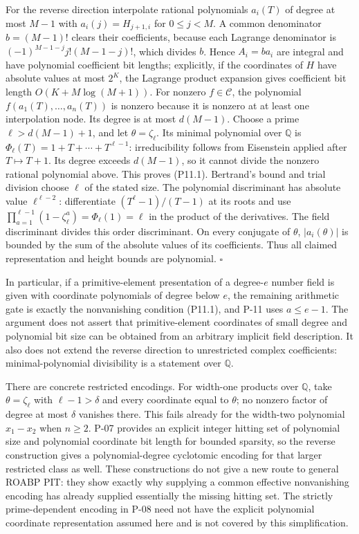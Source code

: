 \documentclass[11pt,a4paper]{article}
\theoremstyle{definition}\newtheorem{definition}{Definition}
\begin{document}
For the reverse direction interpolate rational polynomials $a_i(T)$ of degree at most $M-1$ with $a_i(j)=H_{j+1,i}$ for $0\le j<M$. A common denominator $b=(M-1)!$ clears their coefficients, because each Lagrange denominator is $(-1)^{M-1-j}j!(M-1-j)!$, which divides $b$. Hence $A_i=ba_i$ are integral and have polynomial coefficient bit lengths; explicitly, if the coordinates of $H$ have absolute values at most $2^K$, the Lagrange product expansion gives coefficient bit length $O(K+M\log(M+1))$. For nonzero $f\in\mathcal C$, the polynomial $f(a_1(T),\ldots,a_n(T))$ is nonzero because it is nonzero at at least one interpolation node. Its degree is at most $d(M-1)$. Choose a prime $\ell>d(M-1)+1$, and let $\theta=\zeta_\ell$. Its minimal polynomial over $\mathbb Q$ is $\Phi_\ell(T)=1+T+\cdots+T^{\ell-1}$: irreducibility follows from Eisenstein applied after $T\mapsto T+1$. Its degree exceeds $d(M-1)$, so it cannot divide the nonzero rational polynomial above. This proves (P11.1). Bertrand's bound and trial division choose $\ell$ of the stated size. The polynomial discriminant has absolute value $\ell^{\ell-2}$: differentiate $(T^\ell-1)/(T-1)$ at its roots and use $\prod_{a=1}^{\ell-1}(1-\zeta_\ell^a)=\Phi_\ell(1)=\ell$ in the product of the derivatives. The field discriminant divides this order discriminant. On every conjugate of $\theta$, $|a_i(\theta)|$ is bounded by the sum of the absolute values of its coefficients. Thus all claimed representation and height bounds are polynomial. $\square$

In particular, if a primitive-element presentation of a degree-$e$ number field is given with coordinate polynomials of degree below $e$, the remaining arithmetic gate is exactly the nonvanishing condition (P11.1), and P-11 uses $a\le e-1$. The argument does not assert that primitive-element coordinates of small degree and polynomial bit size can be obtained from an arbitrary implicit field description. It also does not extend the reverse direction to unrestricted complex coefficients: minimal-polynomial divisibility is a statement over $\mathbb Q$.

There are concrete restricted encodings. For width-one products over $\mathbb Q$, take $\theta=\zeta_\ell$ with $\ell-1>\delta$ and every coordinate equal to $\theta$; no nonzero factor of degree at most $\delta$ vanishes there. This fails already for the width-two polynomial $x_1-x_2$ when $n\ge2$. P-07 provides an explicit integer hitting set of polynomial size and polynomial coordinate bit length for bounded sparsity, so the reverse construction gives a polynomial-degree cyclotomic encoding for that larger restricted class as well. These constructions do not give a new route to general ROABP PIT: they show exactly why supplying a common effective nonvanishing encoding has already supplied essentially the missing hitting set. The strictly prime-dependent encoding in P-08 need not have the explicit polynomial coordinate representation assumed here and is not covered by this simplification.
\end{document}
